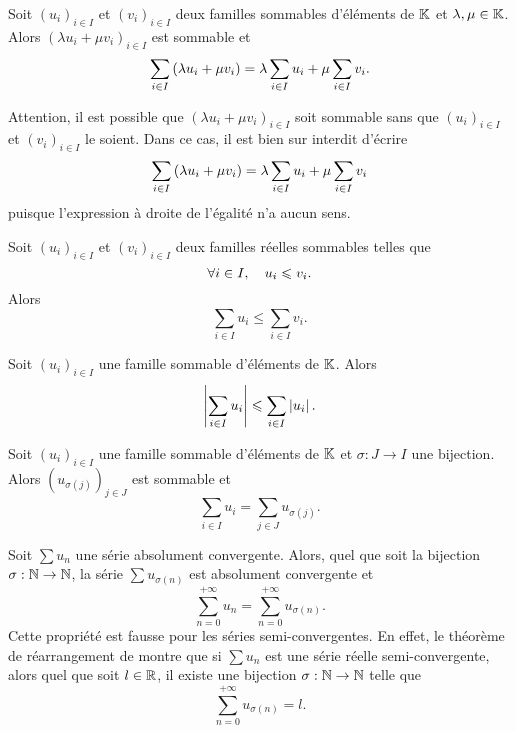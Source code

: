 \documentclass{magnolia}
\begin{document}
\begin{proposition}
Soit $(u_i)_{i\in I}$ et $(v_i)_{i\in I}$ deux familles sommables d'éléments de $\mathbb{K}$ et
$\lambda,\mu\in\mathbb{K}$. Alors $(\lambda u_i+\mu v_i)_{i\in I}$ est sommable et
\[\sum_{i\in I} \left(\lambda u_i+\mu v_i\right) = \lambda \sum_{i\in I} u_i + \mu \sum_{i\in I} v_i.\]
\end{proposition}

\begin{remarqueUnique}
\remarque Attention, il est possible que $(\lambda u_i+\mu v_i)_{i\in I}$ soit sommable sans
  que $(u_i)_{i\in I}$ et $(v_i)_{i\in I}$ le soient. Dans ce cas, il est bien sur
  interdit d'écrire 
  \[\sum_{i\in I} \left(\lambda u_i+\mu v_i\right) = \lambda \sum_{i\in I} u_i + \mu \sum_{i\in I} v_i\]
  puisque l'expression à droite de l'égalité n'a aucun sens.
\end{remarqueUnique}

\begin{proposition}
  Soit $(u_i)_{i\in I}$ et $(v_i)_{i\in I}$ deux familles réelles sommables telles que
  \[\forall i\in I,\quad u_i\leqslant v_i.\]
  Alors
  \[\sum_{i\in I} u_i \leq \sum_{i\in I} v_i.\]
  \end{proposition}

\begin{proposition}
  Soit $(u_i)_{i\in I}$ une famille sommable d'éléments de $\mathbb{K}$. Alors
  \[\left|\sum_{i\in I} u_i\right|\leqslant\sum_{i\in I} \left|u_i\right|.\]
  \end{proposition}

\begin{proposition}
Soit $(u_i)_{i\in I}$ une famille sommable d'éléments de $\mathbb{K}$ et $\sigma:J\to I$ une bijection.
Alors $(u_{\sigma(j)})_{j\in J}$ est sommable et
\[\sum_{i\in I} u_i=\sum_{j\in J} u_{\sigma(j)}.\]
\end{proposition}

\begin{remarques}
\remarque Soit $\sum u_n$ une série absolument convergente. Alors, quel que soit
  la bijection $\sigma:\mathbb{N}\to\mathbb{N}$, la série $\sum u_{\sigma(n)}$ est absolument convergente et
  \[\sum_{n=0}^{+\infty} u_n=\sum_{n=0}^{+\infty} u_{\sigma(n)}.\]
\remarque Cette propriété est fausse pour les séries semi-convergentes. En effet, le théorème de réarrangement
  de  montre que si $\sum u_n$ est une série réelle semi-convergente, alors
  quel que soit
  $l\in\mathbb{R}$, il existe une bijection $\sigma:\mathbb{N}\to\mathbb{N}$ telle que
  \[\sum_{n=0}^{+\infty} u_{\sigma(n)} = l.\]
\end{remarques}
\end{document}
